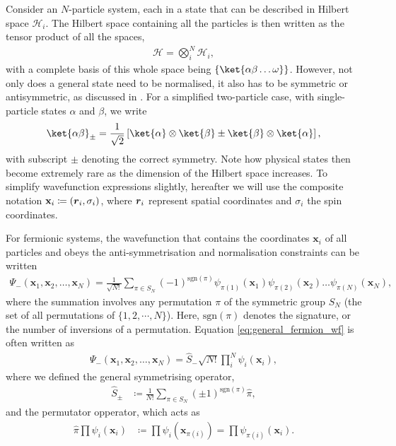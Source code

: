 Consider an $N$-particle system, each in a state that can be described in Hilbert space $\mathcal{H}_i$. The Hilbert space containing all the particles is then written as the tensor product of all the spaces, 
\begin{align*}
    \mathcal{H} = \bigotimes_i^N \mathcal{H}_i,
\end{align*}
with a complete basis of this whole space being $\{\ket{\alpha \beta\dots\omega}\}$. However, not only does a general state need to be normalised, it also has to be symmetric or antisymmetric, as discussed in . For a simplified two-particle case, with single-particle states $\alpha$ and $\beta$, we write 
\begin{align}
    \ket{\alpha \beta}_{\pm} = \frac{1}{\sqrt{2}}\left[\ket{\alpha}\otimes \ket{\beta} \pm \ket{\beta}\otimes \ket{\alpha}\right],
    \label{eq:two_body_state}
\end{align}
with subscript ${\pm}$ denoting the correct symmetry. Note how physical states then become extremely rare as the dimension of the Hilbert space increases. To simplify wavefunction expressions slightly, hereafter we will use the composite notation $\mathbf{x}_i \coloneqq  (\boldsymbol{r}_i, \sigma_i)$, where $\boldsymbol{r}_i$ represent spatial coordinates and $\sigma_i$ the spin coordinates.

For fermionic systems, the wavefunction that contains the coordinates $\mathbf{x}_i$ of all particles and obeys the anti-symmetrisation and normalisation constraints can be written
\begin{align}
\Psi_-(\mathbf{x}_1, \mathbf{x}_2, \dots, \mathbf{x}_N) = \frac{1}{\sqrt{N!}} \sum_{\pi \in S_N} (- 1)^{\text{sgn}(\pi)} \psi_{\pi(1)}(\mathbf{x}_1) \psi_{\pi(2)}(\mathbf{x}_2) \dots \psi_{\pi(N)}(\mathbf{x}_N),
\label{eq:general_fermion_wf}
\end{align}
where the summation involves any permutation $\pi$ of the symmetric group $S_N$ (the set of all permutations of $\{1,2, \cdots, N\}$). Here, $\text{sgn}(\pi)$ denotes the signature, or the number of inversions of a permutation. Equation \ref{eq:general_fermion_wf} is often written as
\begin{align}
    \Psi_{-}(\mathbf{x}_1, \mathbf{x}_2, \ldots, \mathbf{x}_N)  =\hat{S}_{-}\sqrt{N!}\prod_i^N \psi_i(\mathbf{x}_i),\label{eq:general_fermionic}
\end{align}
where we defined the general symmetrising operator,
\begin{align*}
    \hat{S}_{\pm} &\coloneqq \frac{1}{N!} \sum_{\pi \in S_N} (\pm 1)^{\text{sgn}(\pi)} \hat{\pi},
\end{align*}
and the permutator opperator, which acts as
\begin{align*}
    \hat{\pi} \prod \psi_i(\mathbf{x}_i) & \coloneqq \prod \psi_i(\mathbf{x}_{\pi (i)}) = \prod \psi_{\pi(i)}(\mathbf{x}_{i}).
\end{align*}


